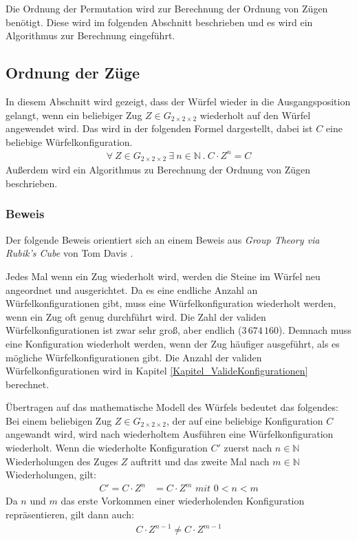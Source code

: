 \documentclass[12pt,a4paper, usenames, dvipsnames]{article}
\theoremstyle{mystyle}
\theoremstyle{definition}
\newcommand{\Gtwo}{\ensuremath{G_{2\times 2\times 2}}}
\begin{document}
Die Ordnung der Permutation wird zur Berechnung der Ordnung von Zügen benötigt. Diese wird im folgenden Abschnitt beschrieben und es wird ein Algorithmus zur Berechnung eingeführt.

%
%
%
%
%
%
%
%
%
%
%
%

\subsection{Ordnung der Züge}
\label{Abschnitt_OrdnungZüge}

In diesem Abschnitt wird gezeigt, dass der Würfel wieder in die Ausgangsposition gelangt, wenn ein beliebiger Zug $Z \in \Gtwo$ wiederholt auf den Würfel angewendet wird. Das wird in der folgenden Formel dargestellt, dabei ist $C$ eine beliebige Würfelkonfiguration.
\begin{align*}
\forall \ Z \in \Gtwo \ \exists \ n \in \mathbb{N} \ . \ C \cdot Z^n = C
\end{align*}
Außerdem wird ein Algorithmus zu Berechnung der Ordnung von Zügen beschrieben.

\subsubsection*{Beweis}

Der folgende Beweis orientiert sich an einem Beweis aus \textit{Group Theory via Rubik's Cube} von Tom Davis \cite{TD}.

Jedes Mal wenn ein Zug wiederholt wird, werden die Steine im Würfel neu angeordnet und ausgerichtet. 
Da es eine endliche Anzahl an Würfelkonfigurationen gibt, muss eine Würfelkonfiguration wiederholt werden, wenn ein Zug oft genug durchführt wird.
Die Zahl der validen Würfelkonfigurationen ist zwar sehr groß, aber endlich ($3 \, 674 \, 160$). Demnach muss eine Konfiguration wiederholt werden, wenn der Zug häufiger ausgeführt, als es mögliche Würfelkonfigurationen gibt. Die Anzahl der validen Würfelkonfigurationen wird in Kapitel \ref{Kapitel_ValideKonfigurationen} berechnet.

Übertragen auf das mathematische Modell des Würfels bedeutet das folgendes: Bei einem beliebigen Zug $Z \in \Gtwo$, der auf eine beliebige Konfiguration $C$ angewandt wird, wird nach wiederholtem Ausführen eine Würfelkonfiguration wiederholt. Wenn die wiederholte Konfiguration $C'$ zuerst nach $n \in \mathbb{N}$ Wiederholungen des Zuges $Z$ auftritt und das zweite Mal nach $m \in \mathbb{N}$ Wiederholungen, gilt: 
\begin{align*}
C' = C \cdot Z^n& = C \cdot Z^m \textit{ mit } 0<n<m 
\end{align*}
Da $n$ und $m$ das erste Vorkommen einer wiederholenden Konfiguration repräsentieren, gilt dann auch:
\begin{align*}
C \cdot Z^{n-1} \neq C \cdot Z^{m-1}
\end{align*}
\end{document}
